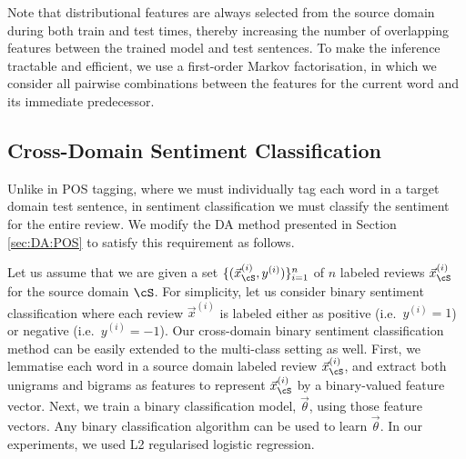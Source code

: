 \documentclass[11pt]{article}
\begin{document}
Note that distributional features are always selected from the source domain during both train and test times, thereby
increasing the number of overlapping features between the trained model and test sentences.
To make the inference tractable and efficient, we use a first-order Markov factorisation, in which we consider all pairwise combinations
between the features for the current word and its immediate predecessor.  

\subsection{Cross-Domain Sentiment Classification}
\label{sec:DA:SA}

Unlike in POS tagging, where we must individually tag each word in a target domain test sentence, in sentiment classification
we must classify the sentiment for the entire review. We modify the DA method presented in
Section \ref{sec:DA:POS} to satisfy this requirement as follows.
 
 Let us assume that we are given a set $\{(\vec{x}^{(i)}_{\cS}, y^{(i)})\}_{i=1}^{n}$ of $n$ labeled reviews $\vec{x}^{(i)}_{\cS}$ 
 for the source domain $\cS$. For simplicity, let us consider binary sentiment classification where each review $\vec{x}^{(i)}$ is 
 labeled either as positive (i.e.\ $y^{(i)} = 1$) or negative (i.e.\ $y^{(i)} = -1$). 
 Our cross-domain binary sentiment classification method can be easily extended to the multi-class setting as well.
 First, we lemmatise each word in a source domain labeled review $\vec{x}^{(i)}_{\cS}$, 
 and extract both unigrams and bigrams as features to represent $\vec{x}^{(i)}_{\cS}$ by a binary-valued feature vector.
 Next, we train a binary classification model, $\vec{\theta}$, using those feature vectors.
 Any binary classification algorithm can be used to learn $\vec{\theta}$.
 In our experiments, we used L2 regularised logistic regression. 
 
\end{document}
